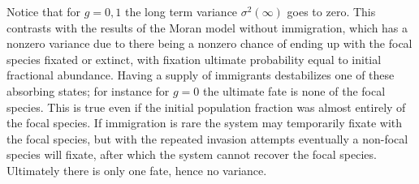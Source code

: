 Notice that for $g=0,1$ the long term variance $\sigma^2(\infty)$ goes to zero. 
This contrasts with the results of the Moran model without immigration, which has a nonzero variance due to there being a nonzero chance of ending up with the focal species fixated or extinct, with fixation ultimate probability equal to initial fractional abundance. 
Having a supply of immigrants destabilizes one of these absorbing states; for instance for $g=0$ the ultimate fate is none of the focal species. %
This is true even if the initial population fraction was almost entirely of the focal species. If immigration is rare the system may temporarily fixate with the focal species, but with the repeated invasion attempts eventually a non-focal species will fixate, after which the system cannot recover the focal species. 
Ultimately there is only one fate, hence no variance. 

